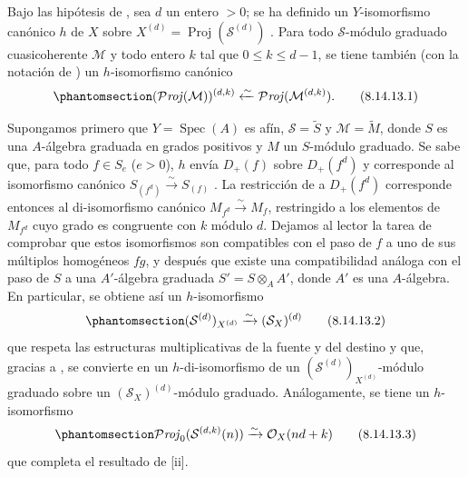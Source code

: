 \documentclass[oneside,10pt]{amsart}
\newcommand{\oldpage}[2][]{\marginnote{\normalfont\footnotesize\textbf{#1}~|~#2}\ignorespaces}
\let\EGAOriginalLabel\label
\renewcommand{\label}[1]{\phantomsection\EGAOriginalLabel{#1}}
\begin{document}
\begin{remark}[8.14.13]
\label{II.8.14.13-fr}
Bajo las hipótesis de , sea $d$ un entero $>0$;
se ha definido un $Y$-isomorfismo canónico $h$ de $X$ sobre $X^{(d)}=\operatorname{Proj}(\mathcal{S}^{(d)})$ .
Para todo
\oldpage[II]{202}
$\mathcal{S}$-módulo graduado cuasicoherente $\mathcal{M}$ y todo entero $k$ tal que $0\leqslant k\leqslant d-1$, se tiene también (con la notación de ) un $h$-isomorfismo canónico
\begin{equation}
\label{II.8.14.13.1-fr}
  (\mathcal{P}\mathit{roj}(\mathcal{M}))^{(d,k)}
  \xleftarrow{\sim}\mathcal{P}\mathit{roj}(\mathcal{M}^{(d,k)}).
\tag{8.14.13.1}
\end{equation}

Supongamos primero que $Y=\operatorname{Spec}(A)$ es afín, $\mathcal{S}=\widetilde{S}$ y $\mathcal{M}=\widetilde{M}$, donde $S$ es una $A$-álgebra graduada en grados positivos y $M$ un $S$-módulo graduado.
Se sabe que, para todo $f\in S_e$ ($e>0$), $h$ envía $D_+(f)$ sobre $D_+(f^d)$ y corresponde al isomorfismo canónico $S_{(f^d)}\xrightarrow{\sim}S_{(f)}$ .
La restricción de  a $D_+(f^d)$ corresponde entonces al di-isomorfismo canónico $M_{f^d}\xrightarrow{\sim}M_f$, restringido a los elementos de $M_{f^d}$ cuyo grado es congruente con $k$ módulo $d$.
Dejamos al lector la tarea de comprobar que estos isomorfismos son compatibles con el paso de $f$ a uno de sus múltiplos homogéneos $fg$, y después que existe una compatibilidad análoga con el paso de $S$ a una $A'$-álgebra graduada $S'=S\otimes_A A'$, donde $A'$ es una $A$-álgebra.
En particular, se obtiene así un $h$-isomorfismo
\begin{equation}
\label{II.8.14.13.2-fr}
  (\mathcal{S}^{(d)})_{X^{(d)}}
  \xrightarrow{\sim}(\mathcal{S}_X)^{(d)}
\tag{8.14.13.2}
\end{equation}
que respeta las estructuras multiplicativas de la fuente y del destino y que, gracias a , se convierte en un $h$-di-isomorfismo de un $(\mathcal{S}^{(d)})_{X^{(d)}}$-módulo graduado sobre un $(\mathcal{S}_X)^{(d)}$-módulo graduado.
Análogamente, se tiene un $h$-isomorfismo
\begin{equation}
\label{II.8.14.13.3-fr}
  \mathcal{P}\mathit{roj}_0(\mathcal{S}^{(d,k)}(n))
  \xrightarrow{\sim}\mathcal{O}_X(nd+k)
\tag{8.14.13.3}
\end{equation}
que completa el resultado de [ii].


\end{remark}
\end{document}
